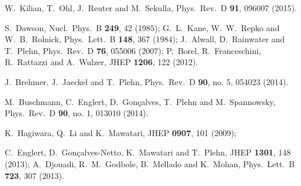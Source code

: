   W.~Kilian, T.~Ohl, J.~Reuter and M.~Sekulla,
  Phys.\ Rev.\ D {\bf 91}, 096007 (2015).

  S.~Dawson,
  Nucl.\ Phys.\ B {\bf 249}, 42 (1985);
  G.~L.~Kane, W.~W.~Repko and W.~B.~Rolnick,
  Phys.\ Lett.\ B {\bf 148}, 367 (1984);
  J.~Alwall, D.~Rainwater and T.~Plehn,
  Phys.\ Rev.\ D {\bf 76}, 055006 (2007);
  P.~Borel, R.~Franceschini, R.~Rattazzi and A.~Wulzer,
  JHEP {\bf 1206}, 122 (2012).

  J.~Brehmer, J.~Jaeckel and T.~Plehn,
  Phys.\ Rev.\ D {\bf 90}, no. 5, 054023 (2014).
  
  M.~Buschmann, C.~Englert, D.~Gon\c{c}alves, T.~Plehn and M.~Spannowsky,
  Phys.\ Rev.\ D {\bf 90}, no. 1, 013010 (2014).

  K.~Hagiwara, Q.~Li and K.~Mawatari,
  JHEP {\bf 0907}, 101 (2009);

  C.~Englert, D.~Gon\c{c}alves-Netto, K.~Mawatari and T.~Plehn,
  JHEP {\bf 1301}, 148 (2013);
  A.~Djouadi, R.~M.~Godbole, B.~Mellado and K.~Mohan,
  Phys.\ Lett.\ B {\bf 723}, 307 (2013).

